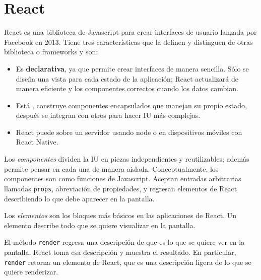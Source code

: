 

\section*{React}


React es una biblioteca de Javascript para crear interfaces de usuario
lanzada por Facebook en 2013.
Tiene tres características que la definen y distinguen  de otras
biblioteca o frameworks y son:
\begin{itemize}
\item {} 
Es \textbf{declarativa}, ya que permite crear interfaces de manera sencilla. Sólo se diseña una vista para cada estado de la aplicación; React actualizará de manera eficiente y  los componentes correctos cuando los datos cambian.

\item {} 
Está , construye componentes encapsulados que manejan su propio estado, después se integran con otros para hacer IU más complejas.

\item {} 
React puede  sobre un servidor usando node o en dispositivos móviles con React Native.

\end{itemize}


Los \textit{componentes} dividen la IU en piezas independientes y reutilizables; además
permite pensar en cada una de manera aislada.
Conceptualmente, los componentes son como funciones de Javascript. Aceptan
entradas arbitrarias llamadas \texttt{props}, abreviación de propiedades, y regresan elementos
de React describiendo lo que debe aparecer en la pantalla.

Los \textit{elementos} son los bloques más básicos en las aplicaciones de React. Un elemento
describe todo que se quiere visualizar en la pantalla.

%
\begin{sphinxVerbatim}[commandchars=\\\{\}]
    
\end{sphinxVerbatim}


El método \texttt{render} regresa una descripción
de que es lo que se quiere ver en la pantalla. React
toma esa descripción y muestra el resultado. En
particular, \texttt{render} retorna un elemento de React,
que es una descripción ligera de lo que se quiere 
renderizar.

